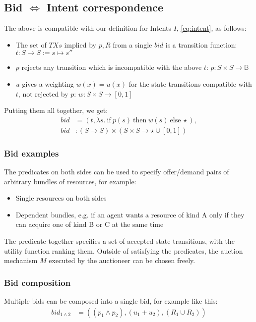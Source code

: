 \subsection{Bid $\Leftrightarrow$ Intent correspondence}
The above is compatible with our definition for Intents $I$, \eqref{eq:intent},
as follows: 

\begin{itemize}
    \item The set of $TXs$ implied by $p, R$ from a single $bid$ is a transition function: $t: S \to S := s \mapsto s''$ 
    \item $p$ rejects any transition which is incompatible with the above $t$: $p : S \times S \to \mathbb{B}$
    \item $u$ gives a weighting $w(x) = u(x)$ for the state transitions compatible with $t$, not rejected by $p$: $w: S \times S \to [0, 1]$
\end{itemize}

Putting them all together, we get:
\begin{equation}
    \begin{aligned}  
    bid &= (t, \lambda s.\ \text{if}\ p(s)\ \text{then}\ w(s)\ \text{else}\ \star),\\
    bid &: (S \rightarrow S) \times (S \times S \rightarrow \star \cup [0, 1])
    \end{aligned}
\end{equation}

\subsubsection{Bid examples}

The predicates on both sides can be used to specify offer/demand pairs of arbitrary bundles of resources, for example:

\begin{itemize}
    \item Single resources on both sides
    \item Dependent bundles, e.g. if an agent wants a resource of kind A only if they can acquire one of kind B or C at the same time
\end{itemize}

The predicate together specifies a set of accepted state transitions, with the utility function ranking them. Outside of satisfying the predicates, the auction mechanism $M$ executed by the auctioneer can be chosen freely. 

\subsubsection{Bid composition} Multiple bids can be composed into a single bid, for example like this:
\begin{equation} 
    \begin{aligned}
    bid_{1\land2} &= ((p_1 \land p_2), (u_1 + u_2), (R_1 \cup R_2)) \\
    \end{aligned}
\end{equation}

